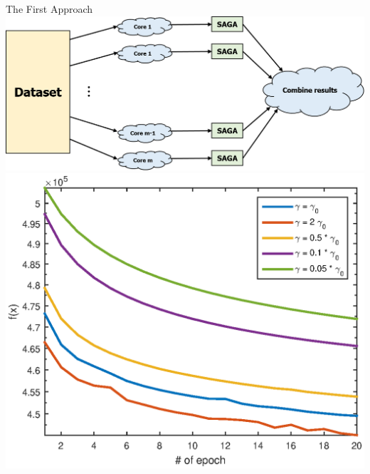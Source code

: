 \begin{frame}{The First Approach}
	\centering
	\includegraphics[scale=0.35]{Picture1.PNG}
	\visible<2>
	{
		\medskip
		\medskip
		\centering
		\includegraphics[scale=0.5]{distributed1.eps} 
	}
\end{frame}

